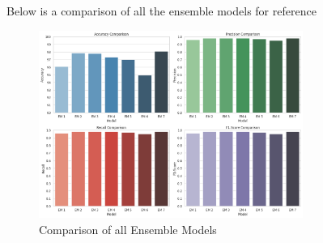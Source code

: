 \vspace{1em}

\noindent
Below is a comparison of all the ensemble models for reference

\begin{figure}[h!]  
    \centering
    \includegraphics[width=0.77\textwidth]{Images/EM COMPARE.png}  
    \caption{Comparison of all Ensemble Models}
    \label{lstm arch}  %
\end{figure}


\pagebreak





